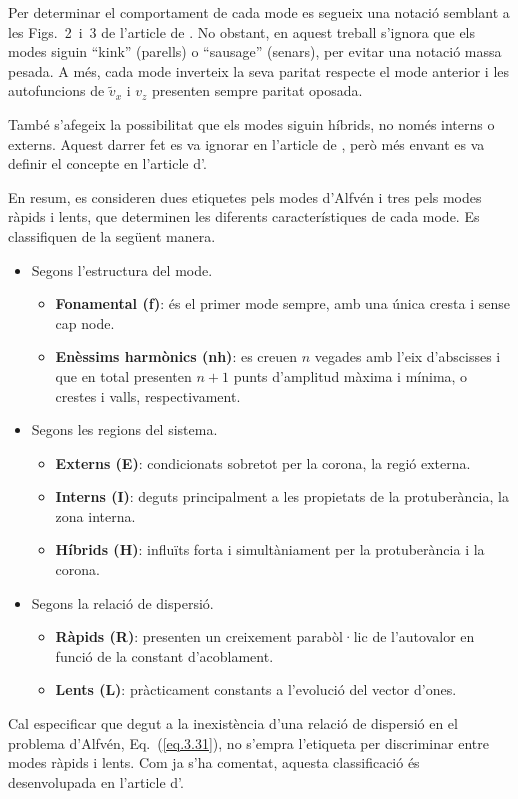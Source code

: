 \documentclass[12pt,a4paper]{article}
\numberwithin{equation}{section}
\begin{document}
Per determinar el comportament de cada mode es segueix una notació semblant a les Figs.~2~i~3 de l'article de \textcite{oscillation_modes_II}.
No obstant, en aquest treball s'ignora que els modes siguin ``kink'' (parells) o ``sausage'' (senars), per evitar una notació massa pesada.
A més, cada mode inverteix la seva paritat respecte el mode anterior i les autofuncions de $\tilde{v}_{x}$ i $v_z$ presenten sempre paritat oposada.

També s'afegeix la possibilitat que els modes siguin híbrids, no només interns o externs.
Aquest darrer fet es va ignorar en l'article de \textcite{oscillation_modes_II}, però més envant es va definir el concepte en l'article d'\textcite{oscillations_quiescent_solar_prominence}.

En resum, es consideren dues etiquetes pels modes d'Alfvén i tres pels modes ràpids i lents,
que determinen les diferents característiques de cada mode.
Es classifiquen de la següent manera.
\begin{itemize}
    \item Segons l'estructura del mode.
    \begin{itemize}
        \item \textbf{Fonamental (f)}: és el primer mode sempre, amb una única cresta i sense cap node.
        \item \textbf{Enèssims harmònics (nh)}: es creuen $n$ vegades amb l'eix d'abscisses i que en total presenten $n + 1$ punts d'amplitud màxima i mínima, o crestes i valls, respectivament.
    \end{itemize}
    
    \item Segons les regions del sistema.
    \begin{itemize}
        \item \textbf{Externs (E)}: condicionats sobretot per la corona, la regió externa.
        \item \textbf{Interns (I)}: deguts principalment a les propietats de la protuberància, la zona interna.
        \item \textbf{Híbrids (H)}: influïts forta i simultàniament per la protuberància i la corona.
    \end{itemize}

    \item Segons la relació de dispersió.
    \begin{itemize}
        \item \textbf{Ràpids (R)}: presenten un creixement parabòl·lic de l'autovalor en funció de la constant d'acoblament.
        \item \textbf{Lents (L)}: pràcticament constants a l'evolució del vector d'ones.
    \end{itemize}
\end{itemize}
Cal especificar que degut a la inexistència d'una relació de dispersió en el problema d'Alfvén, Eq.~(\ref{eq.3.31}),
no s'empra l'etiqueta per discriminar entre modes ràpids i lents.
Com ja s'ha comentat, aquesta classificació és desenvolupada en l'article d'\textcite{oscillations_quiescent_solar_prominence}.
\end{document}
